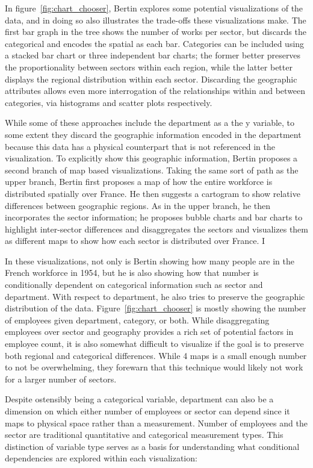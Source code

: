 \documentclass[letterpaper,onecolumn,titlepage]{Ythesis}
\begin{document}
In figure~\ref{fig:chart_chooser}, Bertin explores some potential visualizations of the data, and in doing so also illustrates the trade-offs these visualizations make. The first bar graph in the tree shows the number of works per sector, but discards the categorical and encodes the spatial as each bar. Categories can be included using a stacked bar chart or three independent bar charts; the former  better preserves the proportionality between sectors within each region, while the latter better displays the regional distribution within each sector. Discarding the geographic attributes allows even more interrogation of the relationships within and between categories, via histograms and scatter plots respectively. 

While some of these approaches include the department as a the y variable, to some extent they discard the geographic information encoded in the department because this data has a physical counterpart that is not referenced in the visualization. To explicitly show this geographic information, Bertin proposes a second branch of map based visualizations. Taking the same sort of path as the upper branch, Bertin first proposes a map of how the entire workforce is distributed spatially over France. He then suggests a cartogram to show relative differences between geographic regions. As in the upper branch, he then incorporates the sector information; he proposes bubble charts and bar charts to highlight inter-sector differences and disaggregates the sectors and visualizes them as different maps to show how each sector is distributed over France. I

In these visualizations, not only is Bertin showing how many people are in the French workforce in 1954, but he is also showing how that number is conditionally dependent on categorical information such as sector and department. With respect to department, he also tries to preserve the geographic distribution of the data. Figure~\ref{fig:chart_chooser} is mostly showing the number of employees given department, category, or both. While disaggregating employees over sector and geography provides a rich set of potential factors in employee count, it is also somewhat difficult to visualize if the goal is to preserve both regional and categorical differences. While 4 maps is a small enough number to not be overwhelming, they forewarn that this technique would likely not work for a larger number of sectors. 


Despite ostensibly being a categorical variable, department can also be a dimension \cite{munzner_what:_2014} on which either number of employees or sector can depend since it maps to physical space rather than a measurement. Number of employees and the sector are traditional quantitative and categorical measurement types. This distinction of variable type serves as a basis for understanding what conditional dependencies are explored within each visualization:
\end{document}

